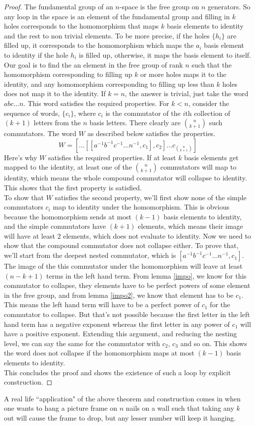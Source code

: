 \documentclass[12pt]{article}
\theoremstyle{definition}
\begin{document}
\begin{proof}
The fundamental group of an $n$-space is the free group on $n$ generators. So any loop in the space is an element of the fundamental group and filling in $k$ holes corresponds to the homomorphism that maps $k$ basis elements to identity and the rest to non trivial elements. To be more precise, if the holes $\{h_i\}$ are filled up, it corresponds to the homomorphism which maps the $a_i$ basis element to identity if the hole $h_i$ is filled up, otherwise, it maps the basis element to itself. Our goal is to find the an element in the free group of rank $n$ such that the homomorphism corresponding to filling up $k$ or more holes maps it to the identity, and any homomorphism corresponding to filling up less than $k$ holes does not map it to the identity.
If $k=n$, the answer is trivial, just take the word $abc\ldots n$. This word satisfies the required properties. For $k<n$, consider the sequence of words, $\{c_i\}$, where $c_i$ is the commutator of the $i$th collection of $(k+1)$ letters from the $n$ basis letters. There clearly are $n \choose {k+1}$ such commutators. The word $W$ as described below satisfies the properties.
$$W = \left[ \ldots [[a^{-1}b^{-1}c^{-1}\ldots n^{-1}, c_1], c_2] \ldots c_{n \choose{k+1}}\right]$$
Here's why $W$ satisfies the required properties. If at least $k$ basis elements get mapped to the identity, at least one of the $n \choose{k+1}$ commutators will map to identity, which means the whole compound commutator will collapse to identity. This shows that the first property is satisfied.\\
To show that $W$ satisfies the second property, we'll first show none of the simple commutators $c_i$ map to identity under the homomorphism. This is obvious because the homomorphism sends at most $(k-1)$ basis elements to identity, and the simple commutators have $(k+1)$ elements, which means their image will have at least $2$ elements, which does not evaluate to identity. Now we need to show that the compound commutator does not collapse either. To prove that, we'll start from the deepest nested commutator, which is $[a^{-1}b^{-1}c^{-1}\ldots n^{-1}, c_1]$. The image of the this commutator under the homomorphism will leave at least $(n-k+1)$ terms in the left hand term. From lemma \autoref{impo}, we know for this commutator to collapse, they elements have to be perfect powers of some element in the free group, and from lemma \autoref{impo2}, we know that element has to be $c_1$. This means the left hand term will have to be a perfect power of $c_1$ for the commutator to collapse. But that's not possible because the first letter in the left hand term has a negative exponent whereas the first letter in any power of $c_1$ will have a positive exponent. Extending this argument, and reducing the nesting level, we can say the same for the commutator with $c_2$, $c_3$ and so on. This shows the word does not collapse if the homomorphism maps at most $(k-1)$ basis elements to identity.\\
This concludes the proof and shows the existence of such a loop by explicit construction.
\end{proof}

A real life ``application" of the above theorem and construction comes in when one wants to hang a picture frame on $n$ nails on a wall such that taking any $k$ out will cause the frame to drop, but any lesser number will keep it hanging.



\end{document}
